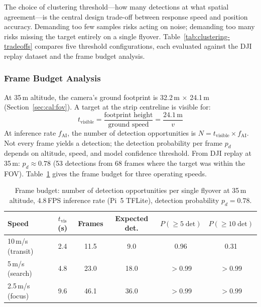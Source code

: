 The choice of clustering threshold---how many detections at what spatial agreement---is the central design trade-off between response speed and position accuracy.  Demanding too few samples risks acting on noise; demanding too many risks missing the target entirely on a single flyover.  Table~\ref{tab:clustering-tradeoffs} compares five threshold configurations, each evaluated against the DJI replay dataset and the frame budget analysis.

\subsubsection{Frame Budget Analysis}\label{sec:frame-budget}

At 35\,m altitude, the camera's ground footprint is 32.2\,m $\times$ 24.1\,m (Section~\ref{sec:cal:fov}).  A target at the strip centreline is visible for:
\begin{equation}
  t_\mathrm{visible} = \frac{\text{footprint height}}{\text{ground speed}} = \frac{24.1\,\text{m}}{v}
\end{equation}
At inference rate $f_\mathrm{AI}$, the number of detection opportunities is $N = t_\mathrm{visible} \times f_\mathrm{AI}$.  Not every frame yields a detection; the detection probability per frame $p_d$ depends on altitude, speed, and model confidence threshold.  From DJI replay at 35\,m: $p_d \approx 0.78$ (53 detections from 68 frames where the target was within the FOV).  Table~\ref{tab:frame-budget} gives the frame budget for three operating speeds.

\begin{table}[htbp]
  \centering
  \caption{Frame budget: number of detection opportunities per single flyover at 35\,m altitude, 4.8\,FPS inference rate (Pi~5 TFLite), detection probability $p_d = 0.78$.}
  \label{tab:frame-budget}
  \begin{tabular}{lccccc}
    \toprule
    \textbf{Speed} & $t_\mathrm{vis}$ (s) & \textbf{Frames} & \textbf{Expected det.} & $P(\geq 5\;\text{det})$ & $P(\geq 10\;\text{det})$ \\
    \midrule
    10\,m/s (transit)   & 2.4  & 11.5 & 9.0  & 0.96 & 0.31 \\
    5\,m/s (search)     & 4.8  & 23.0 & 18.0 & $>$0.99 & $>$0.99 \\
    2.5\,m/s (focus)    & 9.6  & 46.1 & 36.0 & $>$0.99 & $>$0.99 \\
    \bottomrule
  \end{tabular}
\end{table}


